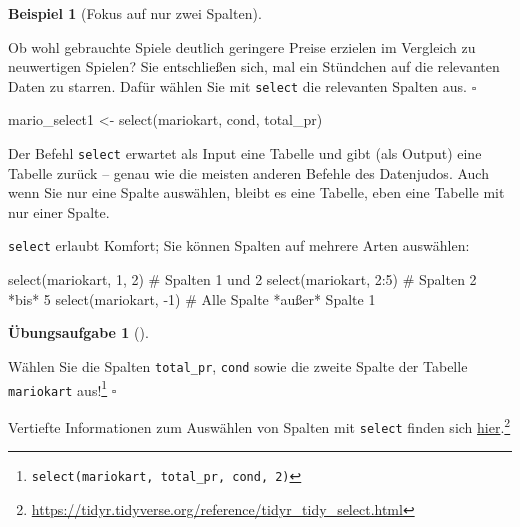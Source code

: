 \documentclass[
  letterpaper,
  twoside,
  open=any]{scrbook}
\newenvironment{Shaded}{\begin{snugshade}}{\end{snugshade}}
\newcommand{\CommentTok}[1]{\textcolor[rgb]{0.37,0.37,0.37}{#1}}
\newcommand{\DecValTok}[1]{\textcolor[rgb]{0.68,0.00,0.00}{#1}}
\newcommand{\FunctionTok}[1]{\textcolor[rgb]{0.28,0.35,0.67}{#1}}
\newcommand{\NormalTok}[1]{\textcolor[rgb]{0.00,0.23,0.31}{#1}}
\newcommand{\OtherTok}[1]{\textcolor[rgb]{0.00,0.23,0.31}{#1}}
\newcommand{\SpecialCharTok}[1]{\textcolor[rgb]{0.37,0.37,0.37}{#1}}
\theoremstyle{definition}
\newtheorem{exercise}{Übungsaufgabe}[chapter]
\theoremstyle{definition}
\newtheorem{example}{Beispiel}[chapter]
\theoremstyle{definition}
\theoremstyle{remark}
\begin{document}
\begin{example}[Fokus auf nur zwei
Spalten]\protect\hypertarget{exm-select}{}\label{exm-select}

Ob wohl gebrauchte Spiele deutlich geringere Preise erzielen im
Vergleich zu neuwertigen Spielen? Sie entschließen sich, mal ein
Stündchen auf die relevanten Daten zu starren. Dafür wählen Sie mit
\texttt{select} die relevanten Spalten aus. \(\square\)

\end{example}

\begin{Shaded}
\begin{Highlighting}[]
\NormalTok{mario\_select1 }\OtherTok{\textless{}{-}} \FunctionTok{select}\NormalTok{(mariokart, cond, total\_pr)}
\end{Highlighting}
\end{Shaded}

Der Befehl \texttt{select} erwartet als Input eine Tabelle und gibt (als
Output) eine Tabelle zurück -- genau wie die meisten anderen Befehle des
Datenjudos. Auch wenn Sie nur eine Spalte auswählen, bleibt es eine
Tabelle, eben eine Tabelle mit nur einer Spalte.

\texttt{select} erlaubt Komfort; Sie können Spalten auf mehrere Arten
auswählen:

\begin{Shaded}
\begin{Highlighting}[]
\FunctionTok{select}\NormalTok{(mariokart, }\DecValTok{1}\NormalTok{, }\DecValTok{2}\NormalTok{)  }\CommentTok{\# Spalten 1 und 2}
\FunctionTok{select}\NormalTok{(mariokart, }\DecValTok{2}\SpecialCharTok{:}\DecValTok{5}\NormalTok{)  }\CommentTok{\#  Spalten 2 *bis* 5 }
\FunctionTok{select}\NormalTok{(mariokart, }\SpecialCharTok{{-}}\DecValTok{1}\NormalTok{)  }\CommentTok{\# Alle Spalte *außer* Spalte 1}
\end{Highlighting}
\end{Shaded}

\begin{exercise}[]\protect\hypertarget{exr-select}{}\label{exr-select}

Wählen Sie die Spalten \texttt{total\_pr}, \texttt{cond} sowie die
zweite Spalte der Tabelle \texttt{mariokart} aus!\footnote{\texttt{select(mariokart,\ total\_pr,\ cond,\ 2)}}
\(\square\)

\end{exercise}

Vertiefte Informationen zum Auswählen von Spalten mit \texttt{select}
finden sich
\href{https://tidyr.tidyverse.org/reference/tidyr_tidy_select.html}{hier}.\footnote{\url{https://tidyr.tidyverse.org/reference/tidyr_tidy_select.html}}
\end{document}
